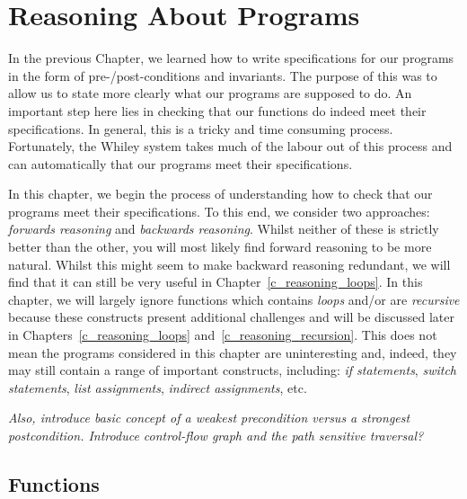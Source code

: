 \chapter{Reasoning About Programs}
In the previous Chapter, we learned how to write specifications for our programs in the form of pre-/post-conditions and invariants.  The purpose of this was to allow us to state more clearly what our programs are supposed to do.  An important step here lies in checking that our functions do indeed meet their specifications.  In general, this is a tricky and time consuming process.  Fortunately, the Whiley system takes much of the labour out of this process and can automatically that our programs meet their specifications.  

In this chapter, we begin the process of understanding how to check that our programs meet their specifications.  To this end, we consider two approaches: {\em forwards reasoning} and {\em backwards reasoning}.  Whilst neither of these is strictly better than the other, you will most likely find forward reasoning to be more natural.  Whilst this might seem to make backward reasoning redundant, we will find that it can still be very useful in Chapter~\ref{c_reasoning_loops}.  In this chapter, we will largely ignore functions which contains {\em loops} and/or are {\em recursive} because these constructs present additional challenges and will be discussed later in Chapters~\ref{c_reasoning_loops} and~\ref{c_reasoning_recursion}.  This does not mean the programs considered in this chapter are uninteresting and, indeed, they may still contain a range of important constructs, including: {\em if statements}, {\em switch statements}, {\em list assignments}, {\em indirect assignments}, etc.

{\em Also, introduce basic concept of a weakest precondition versus a strongest postcondition.  Introduce control-flow graph and the path sensitive traversal?}

\section{Functions}



